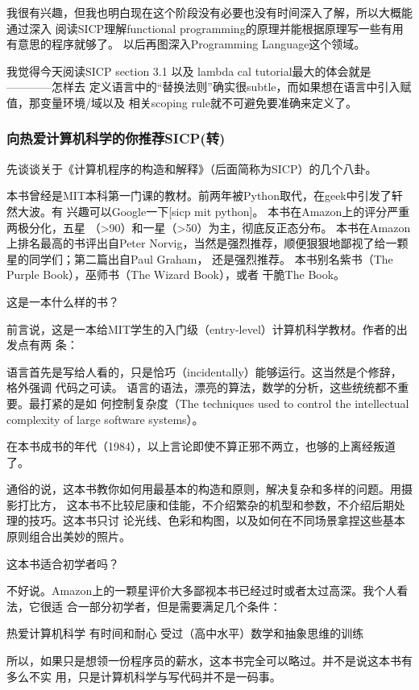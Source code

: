 \documentclass[11pt]{article}
\begin{document}
我很有兴趣，但我也明白现在这个阶段没有必要也没有时间深入了解，所以大概能通过深入
阅读SICP理解functional programming的原理并能根据原理写一些有用有意思的程序就够了。
以后再图深入Programming Language这个领域。

我觉得今天阅读SICP section 3.1 以及 lambda cal tutorial最大的体会就是————怎样去
定义语言中的“替换法则”确实很subtle，而如果想在语言中引入赋值，那变量环境/域以及
相关scoping rule就不可避免要准确来定义了。
\subsubsection*{向热爱计算机科学的你推荐SICP(转)}
\label{sec:orgheadline151}
先谈谈关于《计算机程序的构造和解释》（后面简称为SICP）的几个八卦。

本书曾经是MIT本科第一门课的教材。前两年被Python取代，在geek中引发了轩然大波。有
兴趣可以Google一下[sicp mit python]。 本书在Amazon上的评分严重两极分化，五星
（>90）和一星（>50）为主，彻底反正态分布。 本书在Amazon上排名最高的书评出自Peter
Norvig，当然是强烈推荐，顺便狠狠地鄙视了给一颗星的同学们；第二篇出自Paul Graham，
还是强烈推荐。 本书别名紫书（The Purple Book），巫师书（The Wizard Book），或者
干脆The Book。

这是一本什么样的书？

前言说，这是一本给MIT学生的入门级（entry-level）计算机科学教材。作者的出发点有两
条：

语言首先是写给人看的，只是恰巧（incidentally）能够运行。这当然是个修辞，格外强调
代码之可读。 语言的语法，漂亮的算法，数学的分析，这些统统都不重要。最打紧的是如
何控制复杂度（The techniques used to control the intellectual complexity of
large software systems）。

在本书成书的年代（1984），以上言论即使不算正邪不两立，也够的上离经叛道了。

通俗的说，这本书教你如何用最基本的构造和原则，解决复杂和多样的问题。用摄影打比方，
这本书不比较尼康和佳能，不介绍繁杂的机型和参数，不介绍后期处理的技巧。这本书只讨
论光线、色彩和构图，以及如何在不同场景拿捏这些基本原则组合出美妙的照片。


这本书适合初学者吗？

不好说。Amazon上的一颗星评价大多鄙视本书已经过时或者太过高深。我个人看法，它很适
合一部分初学者，但是需要满足几个条件：

热爱计算机科学 有时间和耐心 受过（高中水平）数学和抽象思维的训练

所以，如果只是想领一份程序员的薪水，这本书完全可以略过。并不是说这本书有多么不实
用，只是计算机科学与写代码并不是一码事。
\end{document}
